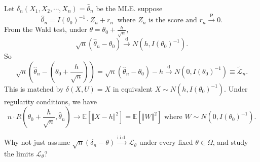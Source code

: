 \documentclass[a4paper]{article}
\begin{document}
\begin{eg}
	Let $\delta_n (X_1,X_2,\cdots,X_n) = \hat{\theta}_n$ be the MLE. suppose
	\begin{equation*}
		\hat{\theta}_n = I(\theta_0)^{-1} \cdot Z_n + r_n \ \text{ where $Z_n$ is the score and $r_n \stackrel{\text{P}}{\longrightarrow} 0$}.
	\end{equation*}
	From the Wald test, under $\theta = \theta_0 + \frac{h}{\sqrt{n}}$,
	\begin{equation*}
		\sqrt{n} (\hat{\theta}_n -\theta_0) \stackrel{\text{d}}{\longrightarrow} N \left(h,I(\theta_0)^{-1}\right).
	\end{equation*}
	So
	\begin{equation*}
		\sqrt{n} \left(\hat{\theta}_n - \left(\theta_0 + \frac{h}{\sqrt{n}}\right)\right) = \sqrt{n} (\hat{\theta}_n -\theta_0) - h \stackrel{\text{d}}{\longrightarrow} N(0,I(\theta_0)^{-1}) \equiv \tilde{\mathcal{L}}_n.
	\end{equation*}
	This is matched by $\delta(X,U) = X$ in equivalent $X \sim N(h,I(\theta_0)^{-1})$. Under regularity conditions, we have
	\begin{equation*}
		n \cdot R \left(\theta_0 + \frac{h}{\sqrt{n}}, \hat{\theta}_n\right) \to \mathbb{E} \left[\Vert X - h \Vert^2\right] = \mathbb{E} \left[\Vert W \Vert^2\right] \text{ where $W \sim N\left(0,I(\theta_0)^{-1}\right)$}.
	\end{equation*}
\end{eg}

\begin{question}
	Why not just assume $\sqrt{n}(\delta_n-\theta) \stackrel{\text{i.i.d.}}{\longrightarrow} \mathcal{L}_{\theta}$ under every fixed $\theta \in \Omega$, and study the limits $\mathcal{L}_{\theta}$?
\end{question}
\end{document}
